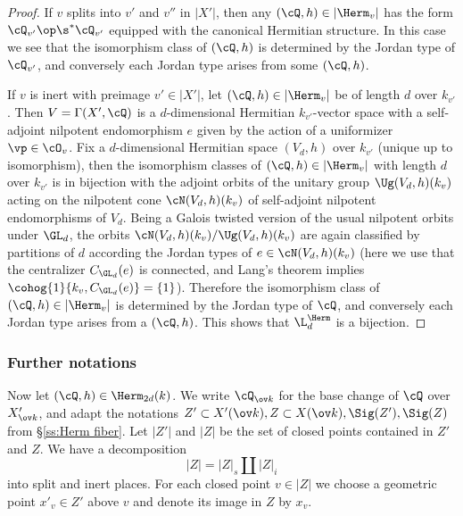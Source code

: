 \begin{proof}
If $v$ splits into $v'$ and $v''$ in $|X'|$, then any $(\cQ,h)\in |\Herm_{v}|$ has the form $\cQ_{v'}\op \s^{*}\cQ_{v'}$ equipped with the canonical Hermitian structure. In this case we see that the isomorphism class of $(\cQ,h)$ is determined by the Jordan type of $\cQ_{v'}$, and conversely each Jordan type arises from some $(\cQ, h)$.

If $v$ is inert with preimage  $v'\in |X'|$, let $(\cQ,h)\in |\Herm_{v}|$ be of length $d$ over $k_{v'}$. Then $V=\Gamma(X',\cQ)$ is a $d$-dimensional Hermitian $k_{v'}$-vector space with a self-adjoint nilpotent endomorphism $e$ given by the action of a uniformizer $\vp\in \cO_{v}$. Fix a $d$-dimensional Hermitian space $(V_{d},h)$ over $k_{v'}$ (unique up to isomorphism), then the isomorphism classes of $(\cQ,h)\in |\Herm_{v}|$ with length $d$ over $k_{v'}$ is in bijection with the adjoint orbits of the unitary group $\Ug(V_{d},h)(k_v)$ acting on the nilpotent cone $\cN(V_{d},h)(k_v)$ of self-adjoint nilpotent endomorphisms of $V_{d}$. Being a Galois twisted version of the usual nilpotent orbits under $\GL_{d}$, the orbits $\cN(V_{d},h)(k_v)/\Ug(V_{d},h)(k_v)$ are again classified by partitions of $d$ according the Jordan types of $e\in \cN(V_{d},h)(k_v)$ (here we use that the centralizer $C_{\GL_{d}}(e)$ is connected, and Lang's theorem implies $\cohog{1}{k_v, C_{\GL_{d}}(e)}=\{1\}$). Therefore the isomorphism class of $(\cQ,h)\in |\Herm_{v}|$ is determined by the Jordan type of $\cQ$, and conversely each Jordan type arises from a $(\cQ, h)$. This shows that $\L^{\Herm}_{d}$ is a bijection.
\end{proof}



\subsubsection{Further notations}\label{sss:choose points}
Now let $(\cQ,h)\in \Herm_{2d}(k)$. We write $\cQ_{\ov k}$ for the base change of $\cQ$ over $X'_{\ov k}$, and adapt the notations $Z'\subset X'(\ov k),Z\subset X(\ov k),\Sig(Z'),\Sig(Z)$ from \S\ref{ss:Herm fiber}. Let $|Z'|$ and $|Z|$ be the set of closed points contained in $Z'$ and $Z$. We have a decomposition
\begin{equation*}
|Z|=|Z|_{s}\coprod |Z|_{i}
\end{equation*}
into split and inert places. For each closed point $v\in |Z|$ we choose a geometric point $x'_{v}\in Z'$ above $v$ and denote its image in $Z$ by $x_{v}$.

